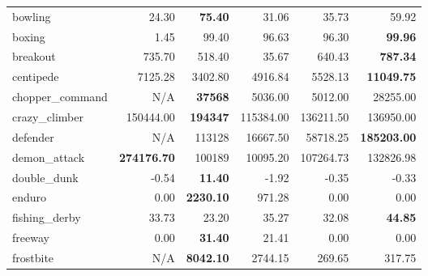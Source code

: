 \begin{center}
\begin{tabular}{l@{\hspace{.26cm}}r@{\hspace{.26cm}}r@{\hspace{.26cm}}r@{\hspace{.26cm}}r@{\hspace{.26cm}}r@{\hspace{.26cm}}}
        bowling            &         24.30       & \textbf{75.40}      &         31.06                     &         35.73            &         59.92         \\
        boxing             &         1.45        &         99.40       &         96.63                     &         96.30            & \textbf{99.96}        \\
        breakout           &         735.70      &         518.40      &         35.67                     &         640.43           & \textbf{787.34}       \\
        centipede          &         7125.28     &         3402.80     &         4916.84                   &         5528.13          & \textbf{11049.75}     \\
        chopper\_command   &         N/A         & \textbf{37568}      &         5036.00                   &         5012.00          &         28255.00      \\
        crazy\_climber     &         150444.00   & \textbf{194347}     &         115384.00                 &         136211.50        &         136950.00     \\
        defender           &         N/A         &         113128      &         16667.50                  &         58718.25         & \textbf{185203.00}    \\
        demon\_attack      & \textbf{274176.70}  &         100189      &         10095.20                  &         107264.73        &         132826.98     \\
        double\_dunk       &         -0.54       & \textbf{11.40}      &         -1.92                     &         -0.35            &         -0.33         \\
        enduro             &         0.00        & \textbf{2230.10}    &         971.28                    &         0.00             &         0.00          \\
        fishing\_derby     &         33.73       &         23.20       &         35.27                     &         32.08            & \textbf{44.85}        \\
        freeway            &         0.00        & \textbf{31.40}      &         21.41                     &         0.00             &         0.00          \\
        frostbite          &         N/A         & \textbf{8042.10}    &         2744.15                   &         269.65           &         317.75        \\

\end{tabular}
\end{center}
